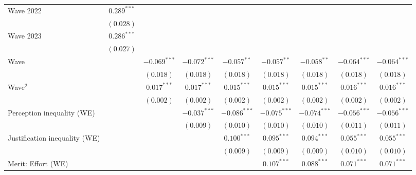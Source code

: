 \documentclass[
  12pt,
]{article}
\begin{document}
\begin{table}
{\begin{center}
{\begin{tabular}{l c c c c c c c c}
\quad Wave 2022                      & $0.289^{***}$  &                &                &                &                &                &                &                \\
                                     & $(0.028)$      &                &                &                &                &                &                &                \\
\quad Wave 2023                      & $0.286^{***}$  &                &                &                &                &                &                &                \\
                                     & $(0.027)$      &                &                &                &                &                &                &                \\
Wave                                 &                & $-0.069^{***}$ & $-0.072^{***}$ & $-0.057^{**}$  & $-0.057^{**}$  & $-0.058^{**}$  & $-0.064^{***}$ & $-0.064^{***}$ \\
                                     &                & $(0.018)$      & $(0.018)$      & $(0.018)$      & $(0.018)$      & $(0.018)$      & $(0.018)$      & $(0.018)$      \\
Wave$^2$                             &                & $0.017^{***}$  & $0.017^{***}$  & $0.015^{***}$  & $0.015^{***}$  & $0.015^{***}$  & $0.016^{***}$  & $0.016^{***}$  \\
                                     &                & $(0.002)$      & $(0.002)$      & $(0.002)$      & $(0.002)$      & $(0.002)$      & $(0.002)$      & $(0.002)$      \\
Perception inequality (WE)           &                &                & $-0.037^{***}$ & $-0.086^{***}$ & $-0.075^{***}$ & $-0.074^{***}$ & $-0.056^{***}$ & $-0.056^{***}$ \\
                                     &                &                & $(0.009)$      & $(0.010)$      & $(0.010)$      & $(0.010)$      & $(0.011)$      & $(0.011)$      \\
Justification inequality (WE)        &                &                &                & $0.100^{***}$  & $0.095^{***}$  & $0.094^{***}$  & $0.055^{***}$  & $0.055^{***}$  \\
                                     &                &                &                & $(0.009)$      & $(0.009)$      & $(0.009)$      & $(0.010)$      & $(0.010)$      \\
Merit: Effort (WE)                   &                &                &                &                & $0.107^{***}$  & $0.088^{***}$  & $0.071^{***}$  & $0.071^{***}$  \\

\end{tabular}}
\end{center}}
\end{table}
\end{document}
